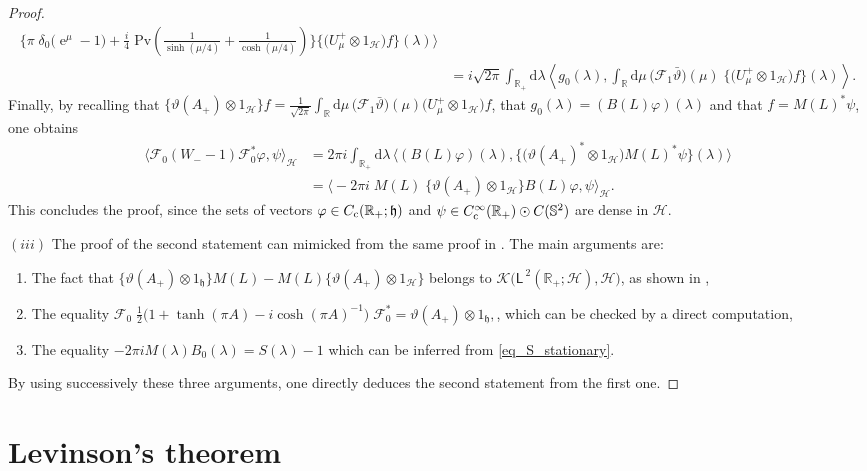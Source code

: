 \documentclass{article}
\def\d{\mathrm{d}}
\def\F{\mathscr F}
\def\H{\mathcal H}
\def\K{\mathscr K}
\def\R{\mathbb R}
\def\S{\mathbb S}
\def\Hrond{\mathscr H}
\def\HS{\mathfrak h}
\def\Pv{\mathrm{Pv}}
\def\ltwo{\mathsf{L}^{\:\!\!2}}
\def\e{\mathop{\mathrm{e}}\nolimits}
\begin{document}
\begin{proof}
\begin{align*}
\bigg\{\pi\;\!\delta_0\big(\e^\mu-1\big) +\frac i4\;\!\Pv\left(\frac1{\sinh(\mu/4)}
+\frac1{\cosh(\mu/4)}\right)\bigg\}
\big\{\big(U_\mu^+\otimes1_{\H}\big)f\big\}(\lambda)
\bigg\rangle\\
&=i\sqrt{2\pi}\int_{\R_+}\d\lambda\left\langle g_0(\lambda),\int_\R\d\mu\,
\big(\F_1\bar\vartheta\big)(\mu)\;\!
\big\{\big(U_\mu^+\otimes1_{\H}\big)f\big\}(\lambda)
\right\rangle.
\end{align*}
Finally, by recalling that
$
\big\{\vartheta(A_+)\otimes1_{\H}\big\}f
=\frac1{\sqrt{2\pi}}\int_\R\d\mu\,\big(\F_1\bar\vartheta\big)(\mu)
\big(U_\mu^+\otimes 1_{\H}\big)f
$,
that $g_0(\lambda)=(B(L)\varphi)(\lambda)$ and that $f=M(L)^*\psi$, one obtains
\begin{align*}
\big\langle\F_0(W_--1)\F_0^*\varphi,\psi\big\rangle_{\!\Hrond}
&=2\pi i\int_{\R_+}\d\lambda\,\big\langle(B(L)\varphi)(\lambda),
\big\{\big(\vartheta(A_+)^*\otimes1_{\H}\big)M(L)^*\psi\big\}(\lambda)
\big\rangle\\
&=\big\langle-2\pi i\;\!M(L)\;\!\big\{\vartheta(A_+)\otimes1_{\H}\big\}B(L)\varphi,
\psi\big\rangle_{\!\Hrond}.
\end{align*}
This concludes the proof, since the sets of vectors $\varphi\in C_{\rm c}(\R_+;\HS)$
and $\psi\in C_{\rm c}^\infty(\R_+)\odot C(\S^2)$ are dense in $\Hrond$.

$(iii)$ The proof of the second statement can mimicked from the same proof in \cite{RT13}.
The main arguments are:
\begin{enumerate}[label=(\roman*)]
\item The fact that $\big\{\vartheta(A_+)\otimes1_{\HS}\big\}M(L)
-M(L)\big\{\vartheta(A_+)\otimes 1_{\H}\big\}$
belongs to $\K\big(\ltwo(\R_+;\H),\Hrond\big)$, as shown in \cite[Lem.~2.7]{RT13},
\item The equality
$\F_0 \;\!\frac12\big(1+\tanh(\pi A)-i\cosh(\pi A)^{-1}\big) \!\;\F_0^*=\vartheta(A_+)\otimes 1_{\HS},$,
which can be checked by a direct computation,  
\item The equality
$-2\pi iM(\lambda)B_0(\lambda)=S(\lambda)-1$ which can be inferred from \eqref{eq_S_stationary}.
\end{enumerate}
By using successively these three arguments, one directly deduces the second statement from the first one.
\end{proof}

\section{Levinson's theorem}\label{sec_topol}
\setcounter{equation}{0}
\end{document}
